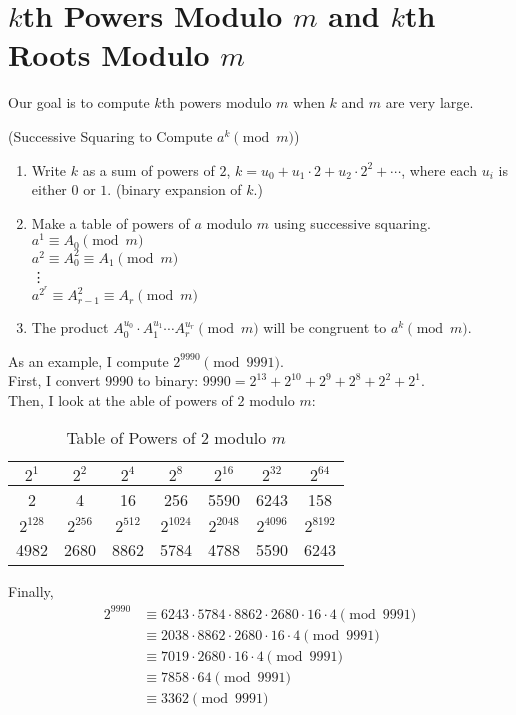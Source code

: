 \section{$k$th Powers Modulo $m$ and $k$th Roots Modulo $m$}

Our goal is to compute $k$th powers modulo $m$ when $k$ and $m$ are very large. 

\begin{algorithm}
(Successive Squaring to Compute $a^{k} \pmod{m}$)
\begin{enumerate}
\item Write $k$ as a sum of powers of $2$, $k = u_{0} + u_{1}\cdot 2 + u_{2}\cdot 2^{2} + \cdots$, where each $u_{i}$ is either $0$ or $1$. (binary expansion of $k$.)
\item Make a table of powers of $a$ modulo $m$ using successive squaring. \\
$a^{1}\equiv A_{0}\pmod{m}$ \\
$a^{2}\equiv A_{0}^{2}\equiv A_{1}\pmod{m}$ \\
\vdots \\
$a^{2^{r}}\equiv A_{r - 1}^{2}\equiv A_{r}\pmod{m}$
\item The product $A_{0}^{u_{0}}\cdot A_{1}^{u_{1}}\cdots A_{r}^{u_{r}}\pmod{m}$ will be congruent to $a^{k}\pmod{m}$. 
\end{enumerate}
\end{algorithm}

\noindent
As an example, I compute $2^{9990}\pmod{9991}$. \\
First, I convert 9990 to binary: $9990 = 2^{13} + 2^{10} + 2^{9} + 2^{8} + 2^{2} + 2^{1}$. \\
Then, I look at the able of powers of $2$ modulo $m$:
\begin{table}[h!]
\centering
\begin{tabular}{||c c c c c c c||} 
  \hline \hline
  $2^{1}$ & $2^{2}$ & $2^{4}$ & $2^{8}$ & $2^{16}$ & $2^{32}$ & $2^{64}$ \\
  \hline
  2 & 4 & 16 & 256 & 5590 & 6243 & 158 \\ 
  \hline \hline
  $2^{128}$ & $2^{256}$ & $2^{512}$ & $2^{1024}$ & $2^{2048}$ & $2^{4096}$ & $2^{8192}$ \\
  \hline
  4982 & 2680 & 8862 & 5784 & 4788 & 5590 & 6243 \\
  \hline \hline
\end{tabular}
\caption{Table of Powers of $2$ modulo $m$}
\end{table}
\noindent
Finally, 
\begin{align*}
2^{9990} &\equiv 6243\cdot 5784\cdot 8862\cdot 2680\cdot 16\cdot 4 \pmod{9991} \\
&\equiv 2038\cdot 8862\cdot 2680\cdot 16\cdot 4 \pmod{9991} \\
&\equiv 7019\cdot 2680\cdot 16\cdot 4 \pmod{9991} \\
&\equiv 7858\cdot 64 \pmod{9991} \\
&\equiv 3362 \pmod{9991}
\end{align*}

